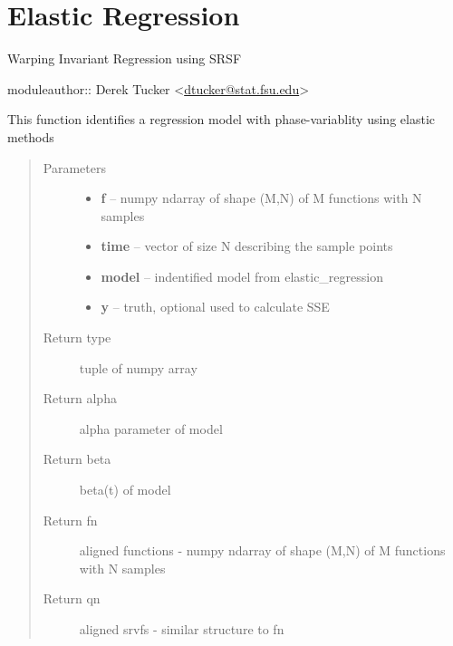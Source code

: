 \documentclass[letterpaper,10pt,english]{sphinxmanual}
\begin{document}
\chapter{Elastic Regression}
\label{regression::doc}\label{regression:module-regression}\label{regression:elastic-regression}
Warping Invariant Regression using SRSF

moduleauthor:: Derek Tucker \textless{}\href{mailto:dtucker@stat.fsu.edu}{dtucker@stat.fsu.edu}\textgreater{}

\begin{fulllineitems}
\label{regression:regression.elastic_prediction}
This function identifies a regression model with phase-variablity using elastic methods
\begin{quote}\begin{description}
\item[{Parameters}] \leavevmode\begin{itemize}
\item {} 
\textbf{f} -- numpy ndarray of shape (M,N) of M functions with N samples

\item {} 
\textbf{time} -- vector of size N describing the sample points

\item {} 
\textbf{model} -- indentified model from elastic\_regression

\item {} 
\textbf{y} -- truth, optional used to calculate SSE

\end{itemize}

\item[{Return type}] \leavevmode
tuple of numpy array

\item[{Return alpha}] \leavevmode
alpha parameter of model

\item[{Return beta}] \leavevmode
beta(t) of model

\item[{Return fn}] \leavevmode
aligned functions - numpy ndarray of shape (M,N) of M functions with N samples

\item[{Return qn}] \leavevmode
aligned srvfs - similar structure to fn


\end{description}
\end{quote}
\end{fulllineitems}
\end{document}
